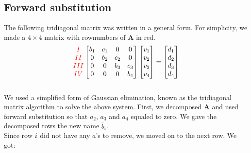 \documentclass[12pt]{article}
\renewcommand{\vec}[1]{\mathbf{#1}}
\newcommand{\RNum}[1]{\uppercase\expandafter{\romannumeral #1\relax}}
\begin{document}



\subsection{Forward substitution}

The following tridiagonal matrix was written in a general form. For simplicity, we made a $4 \times 4$ matrix with rownumbers of  \( \vec{A} \) in red. \\
\begin{align*}
    \begin{matrix}
        \textcolor{red}{I} \\
        \textcolor{red}{II} \\
        \textcolor{red}{III} \\
        \textcolor{red}{IV}
    \end{matrix}
    \begin{bmatrix}
        {b_1} & {c_1} & 0     & 0    \\
        0     & {b_2} & {c_2} & 0     \\
        0     & 0     & {b_3} & {c_3}  \\
        0     & 0     & 0     & {b_4}   \\
    \end{bmatrix}
    \begin{bmatrix}
        v_1 \\
        v_2 \\
        v_3 \\
        v_4
    \end{bmatrix}
    =
    \begin{bmatrix}
        d_1 \\
        d_2 \\
	    d_3 \\
        d_4 \\
    \end{bmatrix}
\end{align*}
\\
\noindent We used a simplified form of Gaussian elimination, known as the tridiagonal matrix algorithm \citep{WikiT} to solve the above system. First, we decomposed $\vec{A}$ and used forward substitution so that $a_2$, $a_3$ and $a_4$ equaled to zero. We gave the decomposed rows the new name $\tilde{b_i}$.\\

\noindent Since row $\RNum{1}$ did not have any $a$'s to remove, we moved on to the next row. We got:
\end{document}
